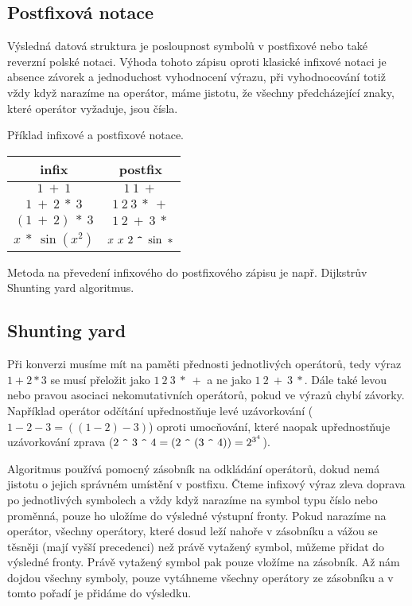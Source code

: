 \documentclass[11pt]{article}
\begin{document}
\subsection{Postfixová notace}
Výsledná datová struktura je posloupnost symbolů v postfixové nebo také
reverzní polské notaci. Výhoda tohoto zápisu oproti klasické infixové notaci
je absence závorek a jednoduchost vyhodnocení výrazu, při vyhodnocování totiž
vždy když narazíme na operátor, máme jistotu, že všechny předcházející znaky, 
které operátor vyžaduje, jsou čísla.

Příklad infixové a postfixové notace.
\begin{center}
\begin{tabular}{|c|c|}
\hline
infix & postfix \\
\hline \hline
$1~+~1$ & $1~1~+$ \\
$1~+~2~*~3$ & $1~2~3~*~+$ \\
$(1~+~2)~*~3$ & $1~2~+~3~*$ \\
$x~*~\sin(x^2)$ & $x~x~2~\verb|^|~\sin~*$ \\
\hline
\end{tabular}
\end{center}

Metoda na převedení infixového do postfixového zápisu je např. Dijkstrův
Shunting yard algoritmus.


\subsection{Shunting yard}
Při konverzi musíme mít na paměti přednosti jednotlivých operátorů, tedy výraz
$1 + 2 * 3$ se musí přeložit jako $1~2~3~*~+$ a ne jako $1~2~+~3~*$.  Dále také
levou nebo pravou asociaci nekomutativních operátorů, pokud ve výrazů chybí
závorky.  Například operátor odčítání upřednostňuje levé uzávorkování ($1 - 2 -
3 = ((1 - 2) - 3)$) oproti umocňování, které naopak upřednostňuje uzávorkování
zprava ($2~\verb|^|~3~\verb|^|~4 = (2~\verb|^|~(3~\verb|^|~4)) = 2^{3^4}$).

Algoritmus používá pomocný zásobník na odkládání operátorů, dokud nemá jistotu
o jejich správném umístění v postfixu. Čteme infixový výraz zleva doprava po
jednotlivých symbolech a vždy když narazíme na symbol typu číslo nebo proměnná,
pouze ho uložíme do výsledné výstupní fronty. Pokud narazíme na operátor,
všechny operátory, které dosud leží nahoře v zásobníku a vážou se těsněji (mají
vyšší precedenci) než právě vytažený symbol, můžeme přidat do výsledné fronty.
Právě vytažený symbol pak pouze vložíme na zásobník. Až nám dojdou všechny
symboly, pouze vytáhneme všechny operátory ze zásobníku a v tomto pořadí je
přidáme do výsledku. \\
\end{document}
